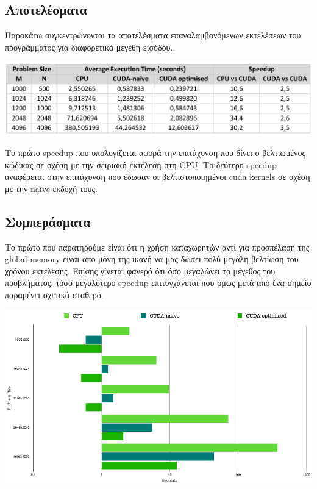 \pagebreak

\subsection*{Αποτελέσματα}

\noindent Παρακάτω συγκεντρώνονται τα αποτελέσματα επαναλαμβανόμενων εκτελέσεων του προγράμματος για διαφορετικά μεγέθη εισόδου.

\begin{center}
    \includegraphics[scale=0.85]{./figures/3_covar/covar}
\end{center}

\noindent Το πρώτο speedup που υπολογίζεται αφορά την επιτάχυνση που δίνει ο βελτιωμένος κώδικας σε σχέση με την σειριακή εκτέλεση στη CPU. Το δεύτερο speedup αναφέρεται στην επιτάχυνση που έδωσαν οι βελτιστοποιημένοι cuda kernels σε σχέση με την naive εκδοχή τους. 

\subsection*{Συμπεράσματα}

Το πρώτο που παρατηρούμε είναι ότι η χρήση καταχωρητών αντί για προσπέλαση της global memory είναι απο μόνη της ικανή να μας δώσει πολύ μεγάλη βελτίωση του χρόνου εκτέλεσης. Επίσης γίνεται φανερό ότι όσο μεγαλώνει το μέγεθος του προβλήματος, τόσο μεγαλύτερο speedup επιτυγχάνεται που όμως μετά από ένα σημείο παραμένει σχετικά σταθερό.

\begin{center}
    \includegraphics[scale=1]{./figures/3_covar/diag}
\end{center}